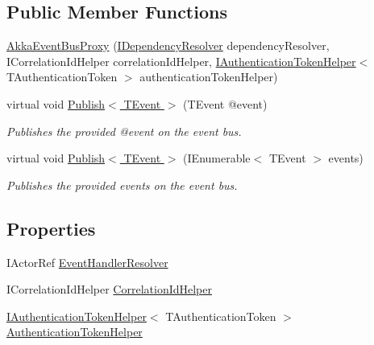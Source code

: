 \subsection*{Public Member Functions}
\begin{DoxyCompactItemize}
\item 
\hyperlink{classCqrs_1_1Akka_1_1Events_1_1AkkaEventBusProxy_a2f886b4e9e64188fe69478c39c96f2b5_a2f886b4e9e64188fe69478c39c96f2b5}{Akka\+Event\+Bus\+Proxy} (\hyperlink{interfaceCqrs_1_1Configuration_1_1IDependencyResolver}{I\+Dependency\+Resolver} dependency\+Resolver, I\+Correlation\+Id\+Helper correlation\+Id\+Helper, \hyperlink{interfaceCqrs_1_1Authentication_1_1IAuthenticationTokenHelper}{I\+Authentication\+Token\+Helper}$<$ T\+Authentication\+Token $>$ authentication\+Token\+Helper)
\item 
virtual void \hyperlink{classCqrs_1_1Akka_1_1Events_1_1AkkaEventBusProxy_a656daead2fe6f30487855dbaea5a3c83_a656daead2fe6f30487855dbaea5a3c83}{Publish$<$ T\+Event $>$} (T\+Event @event)
\begin{DoxyCompactList}\small\item\em Publishes the provided {\itshape @event}  on the event bus. \end{DoxyCompactList}\item 
virtual void \hyperlink{classCqrs_1_1Akka_1_1Events_1_1AkkaEventBusProxy_af4c202eaab00ed2fb6160d5b114d935c_af4c202eaab00ed2fb6160d5b114d935c}{Publish$<$ T\+Event $>$} (I\+Enumerable$<$ T\+Event $>$ events)
\begin{DoxyCompactList}\small\item\em Publishes the provided {\itshape events}  on the event bus. \end{DoxyCompactList}\end{DoxyCompactItemize}
\subsection*{Properties}
\begin{DoxyCompactItemize}
\item 
I\+Actor\+Ref \hyperlink{classCqrs_1_1Akka_1_1Events_1_1AkkaEventBusProxy_abd36f5db7a03a38d573b11c0d6f37117_abd36f5db7a03a38d573b11c0d6f37117}{Event\+Handler\+Resolver}
\item 
I\+Correlation\+Id\+Helper \hyperlink{classCqrs_1_1Akka_1_1Events_1_1AkkaEventBusProxy_a4cc4ec0ece94393246b0c64f02d55f41_a4cc4ec0ece94393246b0c64f02d55f41}{Correlation\+Id\+Helper}
\item 
\hyperlink{interfaceCqrs_1_1Authentication_1_1IAuthenticationTokenHelper}{I\+Authentication\+Token\+Helper}$<$ T\+Authentication\+Token $>$ \hyperlink{classCqrs_1_1Akka_1_1Events_1_1AkkaEventBusProxy_a54964db320ef21b0564e66e9f258f694_a54964db320ef21b0564e66e9f258f694}{Authentication\+Token\+Helper}
\end{DoxyCompactItemize}


